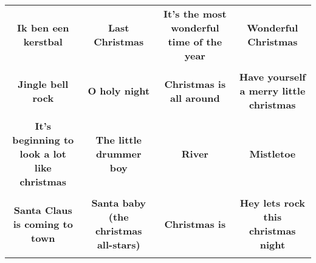 \documentclass[12pt]{article} \usepackage{eso-pic, graphicx}
\newcommand{\background}[1]{%
\AddToShipoutPictureBG*{\texttt{[image: \#1]}}
}
\begin{document}
\tabcolsep=30.2pt \renewcommand{\arraystretch}{4.5}   \vspace*{4.3cm} \begin{center}  \begin{tabular}{c c c c}
\parbox{3cm}{\centering \textbf{Ik ben een kerstbal}}& 
\parbox{3cm}{\centering \textbf{Last Christmas}}& 
\parbox{3cm}{\centering \textbf{It’s the most wonderful time of the year}}& 
\parbox{3cm}{\centering \textbf{Wonderful Christmas}}\\ \\ 
\parbox{3cm}{\centering \textbf{Jingle bell rock}}& 
\parbox{3cm}{\centering \textbf{O holy night}}& 
\parbox{3cm}{\centering \textbf{Christmas is all around}}& 
\parbox{3cm}{\centering \textbf{Have yourself a merry little christmas}}\\ \\ 
\parbox{3cm}{\centering \textbf{It’s beginning to look a lot like christmas}}& 
\parbox{3cm}{\centering \textbf{The little drummer boy}}& 
\parbox{3cm}{\centering \textbf{River}}& 
\parbox{3cm}{\centering \textbf{Mistletoe}}\\ \\ 
\parbox{3cm}{\centering \textbf{Santa Claus is coming to town}}& 
\parbox{3cm}{\centering \textbf{Santa baby (the christmas all-stars)}}& 
\parbox{3cm}{\centering \textbf{Christmas is}}& 
\parbox{3cm}{\centering \textbf{Hey lets rock this christmas night}}\\ \\ 
\end{tabular} \background{discobingo.pdf} \end{center} 
\end{document}
